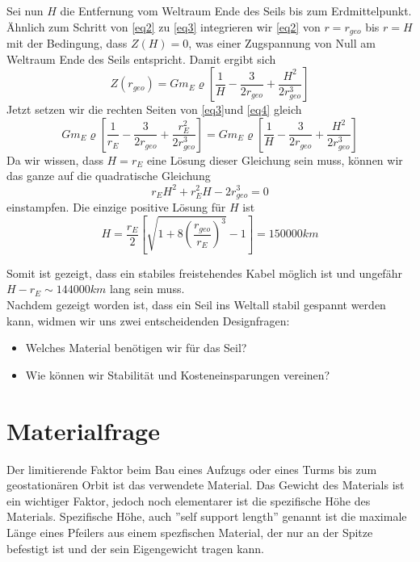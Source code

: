 \documentclass[a4paper, 10pt]{report}
\begin{document}
Sei nun $H$ die Entfernung vom Weltraum Ende des Seils bis zum Erdmittelpunkt. Ähnlich zum Schritt von \autoref{eq2} zu \autoref{eq3} integrieren wir \autoref{eq2} von $r=r_{geo}$ bis $r=H$ mit der Bedingung, dass $Z(H)=0$, was einer Zugspannung von Null am Weltraum Ende des Seils entspricht.
Damit ergibt sich
\begin{equation}
Z(r_{geo}) = Gm_E\varrho[\frac{1}{H} - \frac{3}{2r_{geo}} + \frac{H^2}{2r_{geo}^3}]
\end{equation}
\label{eq4}
Jetzt setzen wir die rechten Seiten von \autoref{eq3}und \autoref{eq4} gleich
\begin{equation*}
Gm_E\varrho[\frac{1}{r_E} - \frac{3}{2r_{geo}} + \frac{r_E^2}{2r_{geo}^3}]=Gm_E\varrho[\frac{1}{H} - \frac{3}{2r_{geo}} + \frac{H^2}{2r_{geo}^3}]
\end{equation*}
Da wir wissen, dass $H=r_E$ eine Lösung dieser Gleichung sein muss, können wir das ganze auf die quadratische Gleichung
\begin{equation}
r_EH^2 + r_E^2H-2r_{geo}^3 =0
\end{equation}
\label{eq5}
einstampfen. Die einzige positive Lösung für $H$ ist\\
\begin{equation*}
H = \frac{r_E}{2}[\sqrt{1+8(\frac{r_{geo}}{r_E})^3}-1] = 150000 km
\end{equation*}

Somit ist gezeigt, dass ein stabiles freistehendes Kabel möglich ist und ungefähr $H-r_E \sim 144000 km$ lang sein muss.\cite[vgl. II Height of a free standing tower at the earth's equator]{AR07}\\


Nachdem gezeigt worden ist, dass ein Seil ins Weltall stabil gespannt werden kann, widmen wir uns zwei entscheidenden Designfragen: 
\begin{itemize}
\item Welches Material benötigen wir für das Seil?
\item Wie können wir Stabilität und Kosteneinsparungen vereinen?
\end{itemize}

\section{Materialfrage}
Der limitierende Faktor beim Bau eines Aufzugs oder eines Turms bis zum geostationären Orbit ist das verwendete Material. Das Gewicht des Materials ist ein wichtiger Faktor, jedoch noch elementarer ist die spezifische Höhe des Materials. Spezifische Höhe, auch ''self support length'' genannt ist die maximale Länge eines Pfeilers aus einem spezfischen Material, der nur an der Spitze befestigt ist und der sein Eigengewicht tragen kann.\cite{wiki:Specific_strength}
\end{document}
